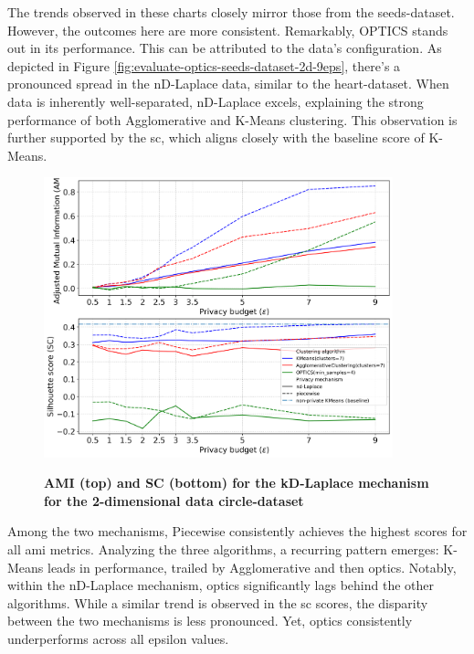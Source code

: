 The trends observed in these charts closely mirror those from the seeds-dataset. However, the outcomes here are more consistent. Remarkably, OPTICS stands out in its performance. This can be attributed to the data's configuration. As depicted in Figure \ref{fig:evaluate-optics-seeds-dataset-2d-9eps}, there's a pronounced spread in the nD-Laplace data, similar to the heart-dataset. When data is inherently well-separated, nD-Laplace excels, explaining the strong performance of both Agglomerative and K-Means clustering. This observation is further supported by the \gls{sc}, which aligns closely with the baseline score of K-Means.
\newpage
\begin{figure}[H]
  \centering
  \caption{\textbf{AMI (top) and SC (bottom) for the kD-Laplace mechanism for the 2-dimensional data circle-dataset}}
  \includegraphics[width=0.9\textwidth]{Results/nd-laplace/nd-Laplace/circle-dataset/ami-and-sc_2_dimensions.png}
  \label{fig:validation-circle-dataset_comparison_2d-laplace}
\end{figure}
Among the two mechanisms, Piecewise consistently achieves the highest scores for all \gls{ami} metrics. Analyzing the three algorithms, a recurring pattern emerges: K-Means leads in performance, trailed by Agglomerative and then \gls{optics}. Notably, within the nD-Laplace mechanism, \gls{optics} significantly lags behind the other algorithms. While a similar trend is observed in the \gls{sc} scores, the disparity between the two mechanisms is less pronounced. Yet, \gls{optics} consistently underperforms across all epsilon values.

